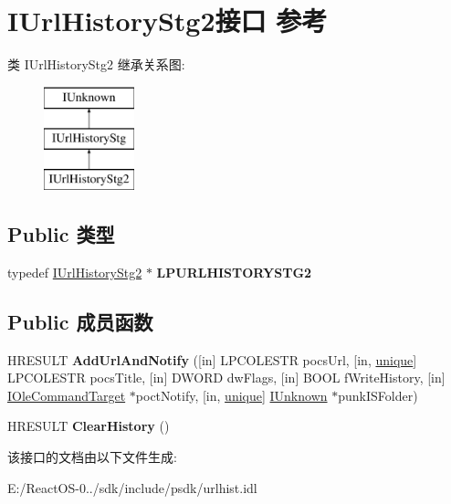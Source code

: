 \hypertarget{interface_i_url_history_stg2}{}\section{I\+Url\+History\+Stg2接口 参考}
\label{interface_i_url_history_stg2}
类 I\+Url\+History\+Stg2 继承关系图\+:\begin{figure}[H]
\begin{center}
\leavevmode
\includegraphics[height=3.000000cm]{interface_i_url_history_stg2}
\end{center}
\end{figure}
\subsection*{Public 类型}
\begin{DoxyCompactItemize}
\item 
\mbox{\label{interface_i_url_history_stg2_a6be4c065504ffcd91e1dc7f9aefe759c}} 
typedef \hyperlink{interface_i_url_history_stg2}{I\+Url\+History\+Stg2} $\ast$ {\bfseries L\+P\+U\+R\+L\+H\+I\+S\+T\+O\+R\+Y\+S\+T\+G2}
\end{DoxyCompactItemize}
\subsection*{Public 成员函数}
\begin{DoxyCompactItemize}
\item 
\mbox{\label{interface_i_url_history_stg2_a85ec95c3f72460d6786f58f792b35361}} 
H\+R\+E\+S\+U\+LT {\bfseries Add\+Url\+And\+Notify} (\mbox{[}in\mbox{]} L\+P\+C\+O\+L\+E\+S\+TR pocs\+Url, \mbox{[}in, \hyperlink{interfaceunique}{unique}\mbox{]} L\+P\+C\+O\+L\+E\+S\+TR pocs\+Title, \mbox{[}in\mbox{]} D\+W\+O\+RD dw\+Flags, \mbox{[}in\mbox{]} B\+O\+OL f\+Write\+History, \mbox{[}in\mbox{]} \hyperlink{interface_i_ole_command_target}{I\+Ole\+Command\+Target} $\ast$poct\+Notify, \mbox{[}in, \hyperlink{interfaceunique}{unique}\mbox{]} \hyperlink{interface_i_unknown}{I\+Unknown} $\ast$punk\+I\+S\+Folder)
\item 
\mbox{\label{interface_i_url_history_stg2_ad4c868ce0e88d23d37789c1b9d513c25}} 
H\+R\+E\+S\+U\+LT {\bfseries Clear\+History} ()
\end{DoxyCompactItemize}


该接口的文档由以下文件生成\+:\begin{DoxyCompactItemize}
\item 
E\+:/\+React\+O\+S-\/0../sdk/include/psdk/urlhist.\+idl\end{DoxyCompactItemize}
